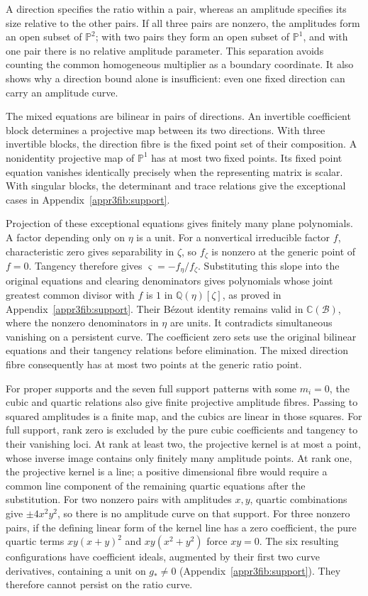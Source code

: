 \documentclass[11pt,a4paper]{article}
\numberwithin{equation}{section}
\theoremstyle{plain}
\theoremstyle{definition}
\theoremstyle{remark}
\begin{document}
A direction specifies the ratio within a pair, whereas an
amplitude specifies its size relative to the other pairs. If all
three pairs are nonzero, the amplitudes form an open subset of
$\mathbb P^2$; with two pairs they form an open subset of
$\mathbb P^1$, and with one pair there is no relative amplitude
parameter. This separation avoids counting the common
homogeneous multiplier as a boundary coordinate. It also shows
why a direction bound alone is insufficient: even one fixed
direction can carry an amplitude curve.

The mixed equations are bilinear in pairs of directions. An
invertible coefficient block determines a projective map between its
two directions. With three invertible blocks, the direction fibre is
the fixed point set of their composition. A nonidentity projective
map of $\mathbb P^1$ has at most two fixed points. Its fixed point
equation vanishes identically precisely when the representing
matrix is scalar. With singular blocks, the determinant and trace
relations give the exceptional cases in
Appendix~\ref{appr3fib:support}.

Projection of these exceptional equations gives finitely many plane
polynomials. A factor depending only on $\eta$ is a unit. For a
nonvertical irreducible factor $f$, characteristic zero gives
separability in $\zeta$, so $f_\zeta$ is nonzero at the generic
point of $f=0$. Tangency therefore gives
$\varsigma=-f_\eta/f_\zeta$. Substituting this
slope into the original equations and clearing denominators gives
polynomials whose joint greatest common divisor with $f$ is $1$
in $\mathbb Q(\eta)[\zeta]$, as proved in
Appendix~\ref{appr3fib:support}. Their B\'ezout identity remains valid
in $\mathbb C(\mathscr B)$, where the nonzero denominators in $\eta$
are units. It contradicts simultaneous vanishing on a persistent
curve. The coefficient zero sets use the original bilinear equations
and their tangency relations before elimination. The mixed direction
fibre consequently has at most two points at the generic ratio point.

For proper supports and the seven full support patterns with
some $m_i=0$, the cubic and quartic relations also give finite
projective amplitude fibres. Passing to squared amplitudes is a
finite map, and the cubics are linear in those squares. For full
support, rank zero is excluded by the pure cubic coefficients and
tangency to their vanishing loci. At rank at least two, the
projective kernel is at most a point, whose inverse image contains
only finitely many amplitude points. At rank one, the projective
kernel is a line; a positive dimensional fibre would require a
common line component of the remaining quartic equations after
the substitution. For two nonzero pairs with amplitudes $x,y$, quartic combinations give
$\pm4x^2y^2$, so there is no amplitude curve on that support.
For three nonzero pairs, if the defining linear form of the kernel
line has a zero coefficient, the pure quartic terms
$xy(x+y)^2$ and $xy(x^2+y^2)$ force $xy=0$.
The six resulting configurations have coefficient ideals, augmented
by their first two curve derivatives, containing a unit on $g_*\ne0$
(Appendix~\ref{appr3fib:support}). They therefore cannot persist
on the ratio curve.
\end{document}
